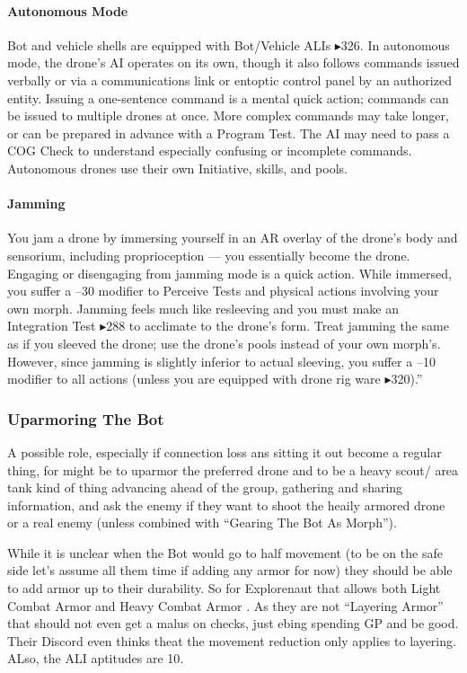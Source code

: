 \paragraph{Autonomous Mode} Bot and vehicle shells are equipped with Bot/Vehicle ALIs $\blacktriangleright$326. In autonomous mode, the drone’s AI operates on its own, though it also follows commands issued verbally or via a communications link or entoptic control panel by an authorized entity. Issuing a one-sentence command is a mental quick action; commands can be issued to multiple drones at once. More complex commands may take longer, or can be prepared in advance with a Program Test. The AI may need to pass a COG Check to understand especially confusing or incomplete commands. Autonomous drones use their own Initiative, skills, and pools.

\paragraph{Jamming} You jam a drone by immersing yourself in an AR overlay of the drone’s body and sensorium, including proprioception — you essentially become the drone. Engaging or disengaging from jamming mode is a quick action. While immersed, you suffer a –30 modifier to Perceive Tests and physical actions involving your own morph. Jamming feels much like resleeving and you must make an Integration Test $\blacktriangleright$288 to acclimate to the drone’s form. Treat jamming the same as if you sleeved the drone; use the drone's pools instead of your own morph's. However, since jamming is slightly inferior to actual sleeving, you suffer a –10 modifier to all actions (unless you are equipped with drone rig ware $\blacktriangleright$320).” \citep[pg. 346]{ep2e_1.1_2019}

\subsubsection{Uparmoring The Bot}

A possible role, especially if connection loss ans sitting it out become a regular thing, for \texttt{\egr{}}\index{\egr{}} might be to uparmor the preferred drone and to be a heavy scout/ area tank kind of thing advancing ahead of the group, gathering and sharing information, and ask the enemy if they want to shoot the heaily armored drone or a real enemy (unless combined with “Gearing The Bot As Morph”).

While it is unclear when the Bot would go to half movement (to be on the safe side let's assume all them time if adding any armor for now) they should be able to add armor up to their durability. So for Explorenaut that allows both Light Combat Armor and Heavy Combat Armor \citep[p. 215]{ep2e_1.1_2019}. As they are not “Layering Armor” that should not even get a malus on checks, just ebing spending GP and be good. Their Discord even thinks theat the movement reduction only applies to layering. ALso, the ALI aptitudes are 10. 

